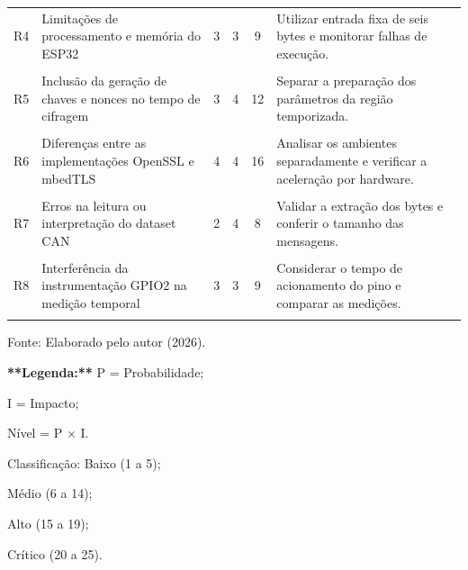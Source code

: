 \begin{quadro}[htbp]
\begin{tabular}{|c|p{3.1cm}|c|c|c|p{5.0cm}|}
\hline



R4 &

Limitações de processamento e memória do ESP32 &

3 & 3 & 9 &

Utilizar entrada fixa de seis bytes e monitorar falhas de execução. \\\\

\hline



R5 &

Inclusão da geração de chaves e nonces no tempo de cifragem &

3 & 4 & 12 &

Separar a preparação dos parâmetros da região temporizada. \\\\

\hline



R6 &

Diferenças entre as implementações OpenSSL e mbedTLS &

4 & 4 & 16 &

Analisar os ambientes separadamente e verificar a aceleração por hardware. \\\\

\hline



R7 &

Erros na leitura ou interpretação do dataset CAN &

2 & 4 & 8 &

Validar a extração dos bytes e conferir o tamanho das mensagens. \\\\

\hline



R8 &

Interferência da instrumentação GPIO2 na medição temporal &

3 & 3 & 9 &

Considerar o tempo de acionamento do pino e comparar as medições. \\\\

\hline



\end{tabular}



\par\smallskip

{\footnotesize Fonte: Elaborado pelo autor (2026).}



\end{quadro}

\noindent

\footnotesize

\textbf{**Legenda:**} P = Probabilidade;

I = Impacto;

Nível = P $\times$ I.

Classificação: Baixo (1 a 5);

Médio (6 a 14);

Alto (15 a 19);

Crítico (20 a 25).

\normalsize